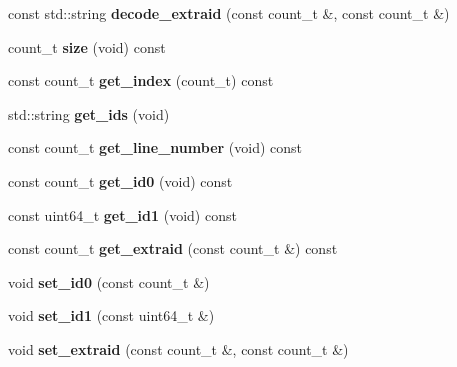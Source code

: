 \begin{DoxyCompactItemize}
\item 
\hypertarget{classgcf__file_aacff6f76ba7993a6ae6cd6a4eaaeeb88}{const std\-::string {\bfseries decode\-\_\-extraid} (const count\-\_\-t \&, const count\-\_\-t \&)}\label{classgcf__file_aacff6f76ba7993a6ae6cd6a4eaaeeb88}

\item 
\hypertarget{classgcf__file_a1d74acf5969f073d5c23fa67304a0008}{count\-\_\-t {\bfseries size} (void) const }\label{classgcf__file_a1d74acf5969f073d5c23fa67304a0008}

\item 
\hypertarget{classgcf__file_a9e147c667d622cfc752d79a702c1f9f9}{const count\-\_\-t {\bfseries get\-\_\-index} (count\-\_\-t) const }\label{classgcf__file_a9e147c667d622cfc752d79a702c1f9f9}

\item 
\hypertarget{classgcf__file_a1b0907de99ddc62d69d6d465fcaa3c0b}{std\-::string {\bfseries get\-\_\-ids} (void)}\label{classgcf__file_a1b0907de99ddc62d69d6d465fcaa3c0b}

\item 
\hypertarget{classgcf__file_a083be33078aa41b454446abfe7b9d546}{const count\-\_\-t {\bfseries get\-\_\-line\-\_\-number} (void) const }\label{classgcf__file_a083be33078aa41b454446abfe7b9d546}

\item 
\hypertarget{classgcf__file_af6beaf34a3bef12e55621edf50232958}{const count\-\_\-t {\bfseries get\-\_\-id0} (void) const }\label{classgcf__file_af6beaf34a3bef12e55621edf50232958}

\item 
\hypertarget{classgcf__file_a7c10bdda397949983be605efcb33e922}{const uint64\-\_\-t {\bfseries get\-\_\-id1} (void) const }\label{classgcf__file_a7c10bdda397949983be605efcb33e922}

\item 
\hypertarget{classgcf__file_a081a46146b7a0240f0bf2f8964e4d410}{const count\-\_\-t {\bfseries get\-\_\-extraid} (const count\-\_\-t \&) const }\label{classgcf__file_a081a46146b7a0240f0bf2f8964e4d410}

\item 
\hypertarget{classgcf__file_afbdea154a8d00f67ec6f8acb2be42162}{void {\bfseries set\-\_\-id0} (const count\-\_\-t \&)}\label{classgcf__file_afbdea154a8d00f67ec6f8acb2be42162}

\item 
\hypertarget{classgcf__file_a2e619e398bc6cd429980165f9f00324c}{void {\bfseries set\-\_\-id1} (const uint64\-\_\-t \&)}\label{classgcf__file_a2e619e398bc6cd429980165f9f00324c}

\item 
\hypertarget{classgcf__file_a3136bd858c2dd2dba8c8ebfee8b0bc70}{void {\bfseries set\-\_\-extraid} (const count\-\_\-t \&, const count\-\_\-t \&)}\label{classgcf__file_a3136bd858c2dd2dba8c8ebfee8b0bc70}

\end{DoxyCompactItemize}

